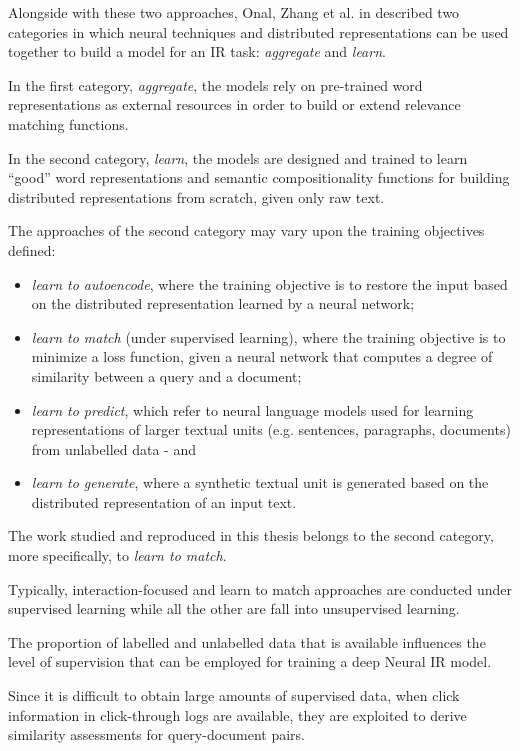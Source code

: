 Alongside with these two approaches, Onal, Zhang et al. in \cite{neurIRearly} described two categories in which neural techniques and distributed representations can be used together to build a model for an IR task: \textit{aggregate} and \textit{learn}.

In the first category, \textit{aggregate}, the models rely on pre-trained word representations as external  resources in order to build or extend relevance matching functions.

In the second category, \textit{learn}, the models are  designed and trained  to learn ``good'' word representations  and  semantic compositionality functions for building distributed representations from scratch, given only raw text.

The approaches of the second category may vary upon the training objectives defined:

\begin{itemize}
    \item \textit{learn to autoencode}, where the training objective  is to restore  the  input based on the distributed representation learned by a neural network;
    \item \textit{learn to match} (under supervised learning), where the training objective is to minimize a loss function, given a neural network that computes a degree of similarity between a query and a document;
    \item \textit{learn to predict}, which refer to neural language models used for learning representations of larger textual units (e.g. sentences, paragraphs, documents) from unlabelled data - and
    \item \textit{learn to generate}, where a synthetic textual unit is generated based on the distributed representation of an input text.
\end{itemize}

The work studied and reproduced in this thesis belongs to the second category, more specifically, to \textit{learn to match}.

Typically, interaction-focused and learn to match approaches are conducted under supervised learning while all the other are fall into unsupervised learning.

The proportion of labelled and unlabelled data that is available influences the level of supervision that can be employed for training a deep Neural IR model.

Since it is difficult to obtain large amounts of supervised data, when click information in click-through logs are available, they are exploited to derive similarity assessments for query-document pairs.

